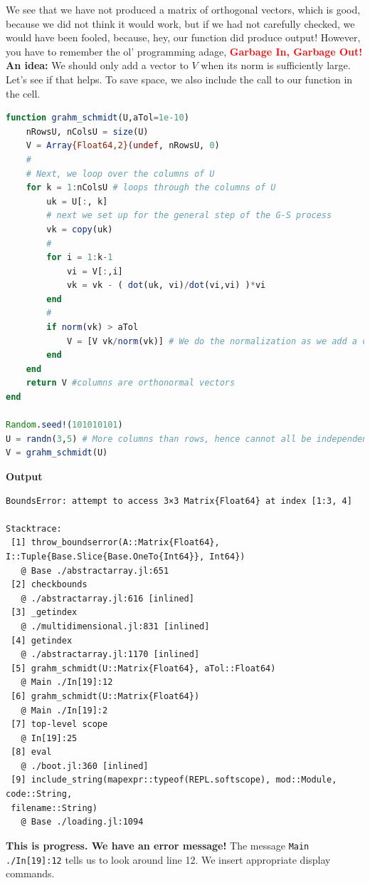 We see that we have not produced a matrix of orthogonal vectors, which is good, because we did not think it would work, but if we had not carefully checked, we would have been fooled, because, hey, our function did produce output! However, you have to remember the ol' programming adage, \textcolor{red}{\bf Garbage In, Garbage Out!}\\

\textbf{An idea:} We should only add a vector to $V$ when its norm is sufficiently large. Let's see if that helps. To save space, we also include the call to our function in the cell.

\begin{lstlisting}[language=Julia,style=mystyle]
function grahm_schmidt(U,aTol=1e-10)
    nRowsU, nColsU = size(U) 
    V = Array{Float64,2}(undef, nRowsU, 0)
    #
    # Next, we loop over the columns of U
    for k = 1:nColsU # loops through the columns of U
        uk = U[:, k] 
        # next we set up for the general step of the G-S process
        vk = copy(uk)
        #
        for i = 1:k-1
            vi = V[:,i]
            vk = vk - ( dot(uk, vi)/dot(vi,vi) )*vi
        end
        #
        if norm(vk) > aTol
            V = [V vk/norm(vk)] # We do the normalization as we add a column to V
        end
    end
    return V #columns are orthonormal vectors
end

Random.seed!(101010101)
U = randn(3,5) # More columns than rows, hence cannot all be independent.
V = grahm_schmidt(U)
\end{lstlisting}
\textbf{Output} 
\begin{verbatim}
BoundsError: attempt to access 3×3 Matrix{Float64} at index [1:3, 4]

Stacktrace:
 [1] throw_boundserror(A::Matrix{Float64}, I::Tuple{Base.Slice{Base.OneTo{Int64}}, Int64})
   @ Base ./abstractarray.jl:651
 [2] checkbounds
   @ ./abstractarray.jl:616 [inlined]
 [3] _getindex
   @ ./multidimensional.jl:831 [inlined]
 [4] getindex
   @ ./abstractarray.jl:1170 [inlined]
 [5] grahm_schmidt(U::Matrix{Float64}, aTol::Float64)
   @ Main ./In[19]:12
 [6] grahm_schmidt(U::Matrix{Float64})
   @ Main ./In[19]:2
 [7] top-level scope
   @ In[19]:25
 [8] eval
   @ ./boot.jl:360 [inlined]
 [9] include_string(mapexpr::typeof(REPL.softscope), mod::Module, code::String, 
 filename::String)
   @ Base ./loading.jl:1094
\end{verbatim}

\textbf{This is progress. We have an error message! } The message \texttt{\@ Main ./In[19]:12} tells us to look around line 12. We insert appropriate display commands.

